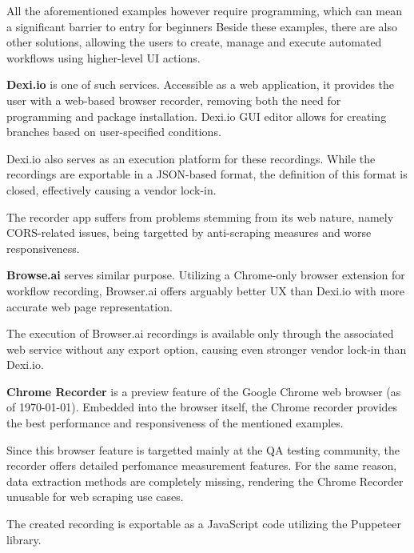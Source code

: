 \emptyline

All the aforementioned examples however require programming, which can mean a significant barrier to entry for beginners
Beside these examples, there are also other solutions, allowing the users to create, manage and execute automated workflows using higher-level UI actions.

\emptyline

\textbf{Dexi.io} is one of such services. 
Accessible as a web application, it provides the user with a web-based browser recorder, removing both the need for programming and package installation.
Dexi.io \ac{GUI} editor allows for creating branches based on user-specified conditions.

Dexi.io also serves as an execution platform for these recordings. 
While the recordings are exportable in a JSON-based format, the definition of this format is closed, effectively causing a vendor lock-in.

The recorder app suffers from problems stemming from its web nature, namely \acs{CORS}-related issues, being targetted by anti-scraping measures and worse responsiveness.

\textbf{Browse.ai} serves similar purpose. 
Utilizing a Chrome-only browser extension for workflow recording, Browser.ai offers arguably better \ac{UX} than Dexi.io with more accurate web page representation.

The execution of Browser.ai recordings is available only through the associated web service without any export option, causing even stronger vendor lock-in than Dexi.io.

\textbf{Chrome Recorder} is a preview feature of the Google Chrome web browser (as of \today).
Embedded into the browser itself, the Chrome recorder provides the best performance and responsiveness of the mentioned examples. 

Since this browser feature is targetted mainly at the \ac{QA} testing community, the recorder offers detailed perfomance measurement features.
For the same reason, data extraction methods are completely missing, rendering the Chrome Recorder unusable for web scraping use cases.

The created recording is exportable as a JavaScript code utilizing the Puppeteer library.